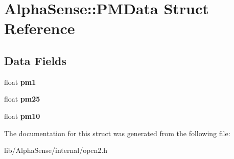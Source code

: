 \hypertarget{structAlphaSense_1_1PMData}{}\section{Alpha\+Sense\+:\+:P\+M\+Data Struct Reference}
\label{structAlphaSense_1_1PMData}
\subsection*{Data Fields}
\begin{DoxyCompactItemize}
\item 
\mbox{\label{structAlphaSense_1_1PMData_af7744fbbc9171376e6de0cdc8c2d5112}} 
float {\bfseries pm1}
\item 
\mbox{\label{structAlphaSense_1_1PMData_aa81deb5da44698a1afb3160131a61107}} 
float {\bfseries pm25}
\item 
\mbox{\label{structAlphaSense_1_1PMData_ae5a18f0aa2805aa7ca69fccb3359e598}} 
float {\bfseries pm10}
\end{DoxyCompactItemize}


The documentation for this struct was generated from the following file\+:\begin{DoxyCompactItemize}
\item 
lib/\+Alpha\+Sense/internal/opcn2.\+h\end{DoxyCompactItemize}
